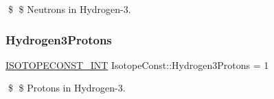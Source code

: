 \$ \$ Neutrons in Hydrogen-\/3. \mbox{\label{group___isotope_const-_hydrogen-_h3_ga20e3b22ea2d3c61d2450a6a2a49971ca}} 
\subsubsection{\texorpdfstring{Hydrogen3\+Protons}{Hydrogen3Protons}}
{\footnotesize\ttfamily \mbox{\hyperlink{group___isotope_const-_macros_ga5f18360b3e99483a35c32d789e62621c}{I\+S\+O\+T\+O\+P\+E\+C\+O\+N\+S\+T\+\_\+\+I\+NT}} Isotope\+Const\+::\+Hydrogen3\+Protons = 1}

\$ \$ Protons in Hydrogen-\/3. 